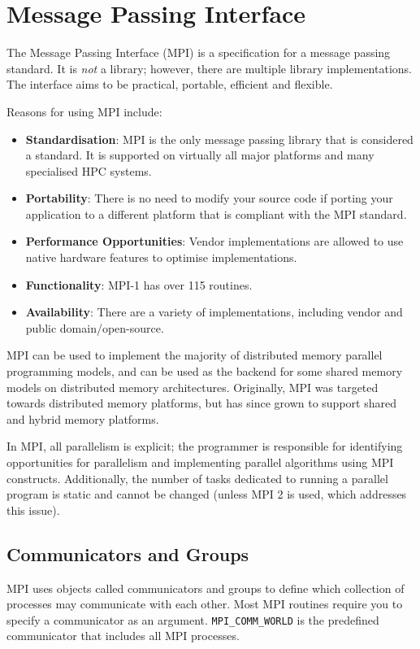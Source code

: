 \chapter{Message Passing Interface}
The Message Passing Interface (MPI) is a specification for a message passing standard. It is \textit{not} a library; however, there are multiple library implementations. The interface aims to be practical, portable, efficient and flexible.

Reasons for using MPI include:
\begin{itemize}
\item \textbf{Standardisation}: MPI is the only message passing library that is considered a standard. It is supported on virtually all major platforms and many specialised HPC systems.
\item \textbf{Portability}: There is no need to modify your source code if porting your application to a different platform that is compliant with the MPI standard.
\item \textbf{Performance Opportunities}: Vendor implementations are allowed to use native hardware features to optimise implementations.
\item \textbf{Functionality}: MPI-1 has over 115 routines.
\item \textbf{Availability}: There are a variety of implementations, including vendor and public domain/open-source.
\end{itemize}

MPI can be used to implement the majority of distributed memory parallel programming models, and can be used as the backend for some shared memory models on distributed memory architectures. Originally, MPI was targeted towards distributed memory platforms, but has since grown to support shared and hybrid memory platforms.

In MPI, all parallelism is explicit; the programmer is responsible for identifying opportunities for parallelism and implementing parallel algorithms using MPI constructs. Additionally, the number of tasks dedicated to running a parallel program is static and cannot be changed (unless MPI 2 is used, which addresses this issue).

\section{Communicators and Groups}
MPI uses objects called communicators and groups to define which collection of processes may communicate with each other. Most MPI routines require you to specify a communicator as an argument. \texttt{MPI\_COMM\_WORLD} is the predefined communicator that includes all MPI processes.

